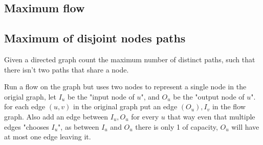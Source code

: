 \subsection{Maximum flow}

\subsection{Maximum of disjoint nodes paths}

Given a directed graph count the maximum number of distinct paths, such that there isn't two paths that share a node.

Run a flow on the graph but uses two nodes to represent a single node in the origial graph, let $I_u$ be the "input node of $u$", and $O_u$ be the "output node of $u$". for each edge $(u, v)$ in the original graph put an edge $(O_u), I_v$ in the flow graph. Also add an edge between $I_u, O_u$ for every $u$ that way even that multiple edges "chooses $I_u$", as between $I_u$ and $O_u$ there is only 1 of capacity, $O_u$ will have at most one edge leaving it.
